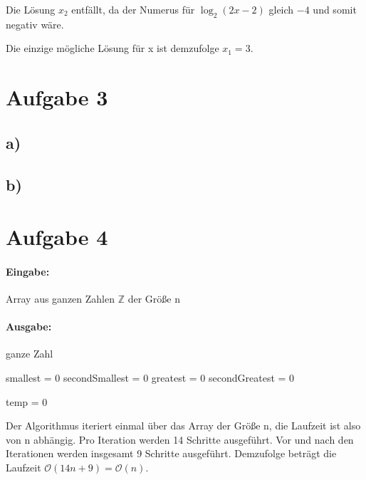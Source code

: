 \documentclass[12pt]{scrartcl}%
\theoremstyle{nonumberplain}
\begin{document}
Die Lösung $x_2$ entfällt, da der Numerus für $\log_{2}{(2x-2)}$ gleich $-4$ und somit negativ wäre.

Die einzige mögliche Lösung für x ist demzufolge $x_1 = 3$.

\newpage

\section*{Aufgabe 3}
\subsection*{a)}

\subsection*{b)}

\newpage

\section*{Aufgabe 4}

\paragraph{Eingabe:} Array aus ganzen Zahlen $\mathbb{Z}$ der Größe n

\paragraph{Ausgabe:} ganze Zahl

\begin{algorithm}[H]
	
	smallest = 0\;
	secondSmallest = 0\;
	greatest = 0\;
	secondGreatest = 0\;
	
	temp = 0\;
	

\end{algorithm}

\vspace{0.3cm}

Der Algorithmus iteriert einmal über das Array der Größe n, die Laufzeit ist also von n abhängig. Pro Iteration werden 14 Schritte ausgeführt. Vor und nach den Iterationen werden insgesamt 9 Schritte ausgeführt. Demzufolge beträgt die Laufzeit $\mathcal{O}(14n+9) = \mathcal{O}(n)$.
\end{document}

